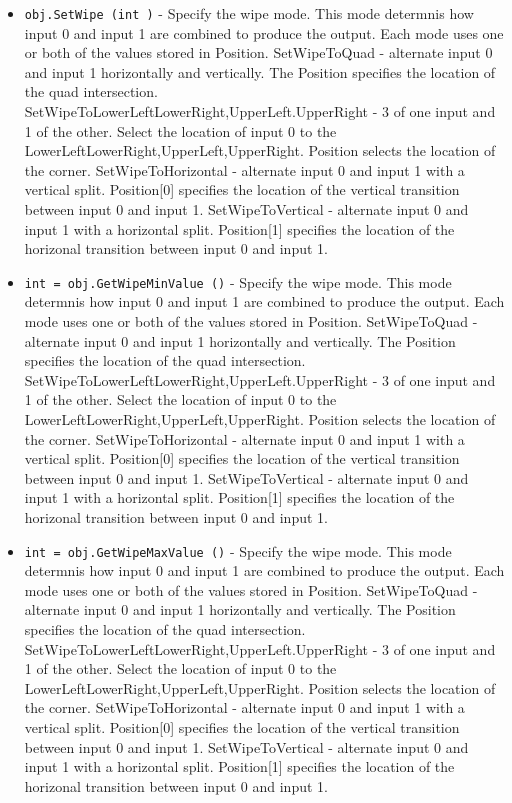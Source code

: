 \begin{itemize}
\item  \verb|obj.SetWipe (int )| -  Specify the wipe mode. This mode determnis how input 0 and input
 1 are combined to produce the output. Each mode uses one or both
 of the values stored in Position.
   SetWipeToQuad - alternate input 0 and input 1 horizontally and
     vertically. The Position specifies the location of the quad
     intersection.
   SetWipeToLowerLeft{LowerRight,UpperLeft.UpperRight} - 3 of one
     input and 1 of the other. Select the location of input 0 to the
     LowerLeft{LowerRight,UpperLeft,UpperRight}. Position
     selects the location of the corner.
   SetWipeToHorizontal - alternate input 0 and input 1 with a vertical
     split. Position[0] specifies the location of the vertical
     transition between input 0 and input 1.
   SetWipeToVertical - alternate input 0 and input 1 with a
     horizontal split. Position[1] specifies the location of the
     horizonal transition between input 0 and input 1.

\item  \verb|int = obj.GetWipeMinValue ()| -  Specify the wipe mode. This mode determnis how input 0 and input
 1 are combined to produce the output. Each mode uses one or both
 of the values stored in Position.
   SetWipeToQuad - alternate input 0 and input 1 horizontally and
     vertically. The Position specifies the location of the quad
     intersection.
   SetWipeToLowerLeft{LowerRight,UpperLeft.UpperRight} - 3 of one
     input and 1 of the other. Select the location of input 0 to the
     LowerLeft{LowerRight,UpperLeft,UpperRight}. Position
     selects the location of the corner.
   SetWipeToHorizontal - alternate input 0 and input 1 with a vertical
     split. Position[0] specifies the location of the vertical
     transition between input 0 and input 1.
   SetWipeToVertical - alternate input 0 and input 1 with a
     horizontal split. Position[1] specifies the location of the
     horizonal transition between input 0 and input 1.

\item  \verb|int = obj.GetWipeMaxValue ()| -  Specify the wipe mode. This mode determnis how input 0 and input
 1 are combined to produce the output. Each mode uses one or both
 of the values stored in Position.
   SetWipeToQuad - alternate input 0 and input 1 horizontally and
     vertically. The Position specifies the location of the quad
     intersection.
   SetWipeToLowerLeft{LowerRight,UpperLeft.UpperRight} - 3 of one
     input and 1 of the other. Select the location of input 0 to the
     LowerLeft{LowerRight,UpperLeft,UpperRight}. Position
     selects the location of the corner.
   SetWipeToHorizontal - alternate input 0 and input 1 with a vertical
     split. Position[0] specifies the location of the vertical
     transition between input 0 and input 1.
   SetWipeToVertical - alternate input 0 and input 1 with a
     horizontal split. Position[1] specifies the location of the
     horizonal transition between input 0 and input 1.


\end{itemize}
